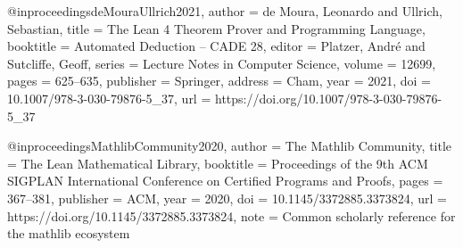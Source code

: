 \documentclass{birkjour}
\theoremstyle{plain}
\theoremstyle{definition}
\theoremstyle{remark}
\begin{document}
@inproceedings{deMouraUllrich2021,
  author    = {de Moura, Leonardo and Ullrich, Sebastian},
  title     = {The {Lean} 4 Theorem Prover and Programming Language},
  booktitle = {Automated Deduction -- {CADE} 28},
  editor    = {Platzer, Andr{\'e} and Sutcliffe, Geoff},
  series    = {Lecture Notes in Computer Science},
  volume    = {12699},
  pages     = {625--635},
  publisher = {Springer},
  address   = {Cham},
  year      = {2021},
  doi       = {10.1007/978-3-030-79876-5_37},
  url       = {https://doi.org/10.1007/978-3-030-79876-5_37}
}

@inproceedings{MathlibCommunity2020,
  author    = {{The Mathlib Community}},
  title     = {The {Lean} Mathematical Library},
  booktitle = {Proceedings of the 9th {ACM} {SIGPLAN} International Conference
               on Certified Programs and Proofs},
  pages     = {367--381},
  publisher = {ACM},
  year      = {2020},
  doi       = {10.1145/3372885.3373824},
  url       = {https://doi.org/10.1145/3372885.3373824},
  note      = {Common scholarly reference for the mathlib ecosystem}
}
\end{document}
